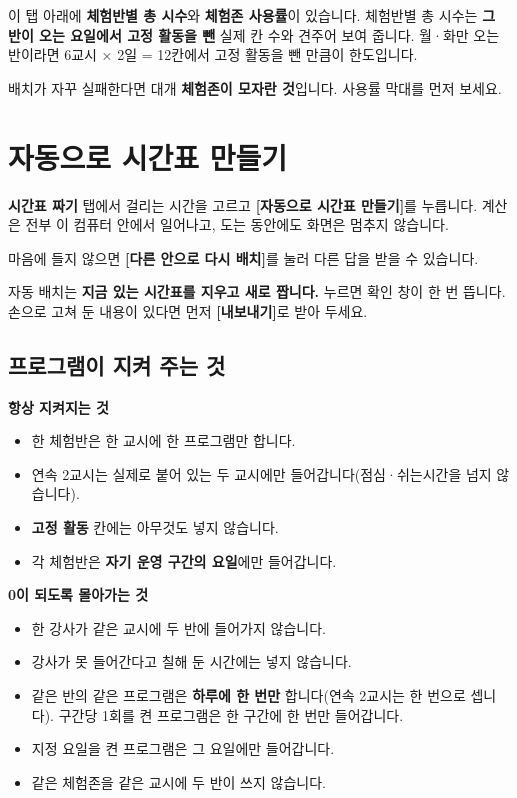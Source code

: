 \documentclass[11pt,a4paper]{article}
\newcommand{\btn}[1]{\textcolor{ttdark}{\sffamily\bfseries[#1]}}   %
\newcommand{\tab}[1]{\textcolor{ttblue}{\sffamily\bfseries#1}}      %
\newcommand{\field}[1]{\textsf{#1}}                                 %
\begin{document}
이 탭 아래에 \textbf{체험반별 총 시수}와 \textbf{체험존 사용률}이 있습니다.
체험반별 총 시수는 \textbf{그 반이 오는 요일에서 고정 활동을 뺀} 실제 칸 수와 견주어 보여 줍니다.
월·화만 오는 반이라면 6교시 × 2일 = 12칸에서 고정 활동을 뺀 만큼이 한도입니다.

\begin{tip}
배치가 자꾸 실패한다면 대개 \textbf{체험존이 모자란 것}입니다. 사용률 막대를 먼저 보세요.
\end{tip}

\section{자동으로 시간표 만들기}

\tab{시간표 짜기} 탭에서 걸리는 시간을 고르고 \btn{자동으로 시간표 만들기}를 누릅니다.
계산은 전부 이 컴퓨터 안에서 일어나고, 도는 동안에도 화면은 멈추지 않습니다.

마음에 들지 않으면 \btn{다른 안으로 다시 배치}를 눌러 다른 답을 받을 수 있습니다.

\begin{warn}
자동 배치는 \textbf{지금 있는 시간표를 지우고 새로 짭니다.} 누르면 확인 창이 한 번 뜹니다.
손으로 고쳐 둔 내용이 있다면 먼저 \btn{내보내기}로 받아 두세요.
\end{warn}

\subsection{프로그램이 지켜 주는 것}

{\sffamily\bfseries\color{ttdark} 항상 지켜지는 것}
\begin{itemize}
  \item 한 체험반은 한 교시에 한 프로그램만 합니다.
  \item 연속 2교시는 실제로 붙어 있는 두 교시에만 들어갑니다(점심·쉬는시간을 넘지 않습니다).
  \item \textbf{고정 활동} 칸에는 아무것도 넣지 않습니다.
  \item 각 체험반은 \textbf{자기 운영 구간의 요일}에만 들어갑니다.
\end{itemize}

{\sffamily\bfseries\color{ttdark} 0이 되도록 몰아가는 것}
\begin{itemize}
  \item 한 강사가 같은 교시에 두 반에 들어가지 않습니다.
  \item 강사가 못 들어간다고 칠해 둔 시간에는 넣지 않습니다.
  \item 같은 반의 같은 프로그램은 \textbf{하루에 한 번만} 합니다(연속 2교시는 한 번으로 셉니다).
        \field{구간당 1회}를 켠 프로그램은 한 구간에 한 번만 들어갑니다.
  \item \field{지정 요일}을 켠 프로그램은 그 요일에만 들어갑니다.
  \item 같은 체험존을 같은 교시에 두 반이 쓰지 않습니다.
\end{itemize}
\end{document}
